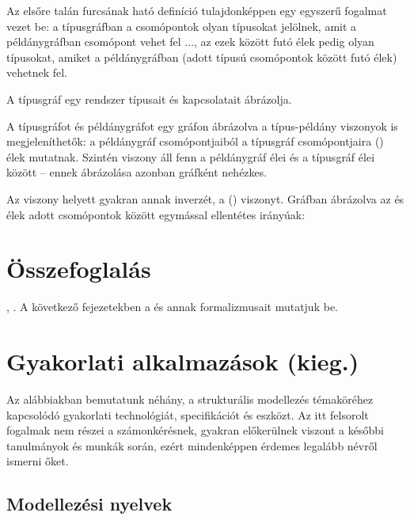 Az elsőre talán furcsának ható definíció tulajdonképpen egy egyszerű fogalmat vezet be: a típusgráfban a csomópontok olyan típusokat jelölnek, amit a példánygráfban csomópont vehet fel ..., az ezek között futó élek pedig olyan típusokat, amiket a példánygráfban (adott típusú csomópontok között futó élek) vehetnek fel. 

A típusgráf egy rendszer  típusait és kapcsolatait ábrázolja.

A típusgráfot és példánygráfot egy gráfon ábrázolva a típus-példány viszonyok is megjeleníthetők: a példánygráf csomópontjaiból a típusgráf csomópontjaira  () élek mutatnak. Szintén  viszony áll fenn a példánygráf élei és a típusgráf élei között -- ennek ábrázolása azonban gráfként nehézkes.

Az  viszony helyett gyakran annak inverzét, a  () viszonyt. Gráfban ábrázolva az  és  élek adott csomópontok között egymással ellentétes irányúak: 


\section{Összefoglalás}

, . A következő fejezetekben a  és annak formalizmusait mutatjuk be.


\section{Gyakorlati alkalmazások (kieg.)}

Az alábbiakban bemutatunk néhány, a strukturális modellezés témaköréhez kapcsolódó gyakorlati technológiát, specifikációt és eszközt. Az itt felsorolt fogalmak nem részei a számonkérésnek, gyakran előkerülnek viszont a későbbi tanulmányok és munkák során, ezért mindenképpen érdemes legalább névről ismerni őket.

\subsection{Modellezési nyelvek}

